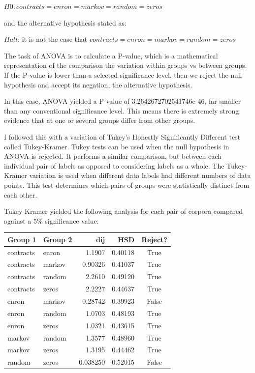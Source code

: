 \documentclass[
]{article}
\newcounter{none} %
\begin{document}
\(H0: contracts = enron = markov = random = zeros\)

and the alternative hypothesis stated as:

\(Halt\): it is not the case that \(contracts = enron = markov = random = zeros\)

The task of ANOVA is to calculate a P-value, which is a mathematical representation of the comparison the variation within groups vs between groups. If the P-value is lower than a selected significance level, then we reject the null hypothesis and accept its negation, the alternative hypothesis.

In this case, ANOVA yielded a P-value of 3.2642672702541746e-46, far smaller than any conventional significance level. This means there is extremely strong evidence that at one or several groups differ from other groups.

I followed this with a variation of Tukey's Honestly Significantly Different test called Tukey-Kramer. Tukey tests can be used when the null hypothesis in ANOVA is rejected. It performs a similar comparison, but between each individual pair of labels as opposed to considering labels as a whole. The Tukey-Kramer variation is used when different data labels had different numbers of data points. This test determines which pairs of groups were statistically distinct from each other.

Tukey-Kramer yielded the following analysis for each pair of corpora compared against a 5\% significance value:

{\def\LTcaptype{none} %
\begin{longtable}[]{@{}llrrc@{}}
\toprule\noalign{}
Group 1 & Group 2 & dij & HSD & Reject? \\
\midrule\noalign{}
\endhead
\bottomrule\noalign{}
\endlastfoot
contracts & enron & 1.1907 & 0.40118 & True \\
contracts & markov & 0.90326 & 0.41037 & True \\
contracts & random & 2.2610 & 0.49120 & True \\
contracts & zeros & 2.2227 & 0.44637 & True \\
enron & markov & 0.28742 & 0.39923 & False \\
enron & random & 1.0703 & 0.48193 & True \\
enron & zeros & 1.0321 & 0.43615 & True \\
markov & random & 1.3577 & 0.48960 & True \\
markov & zeros & 1.3195 & 0.44462 & True \\
random & zeros & 0.038250 & 0.52015 & False \\
\end{longtable}
}
\end{document}
